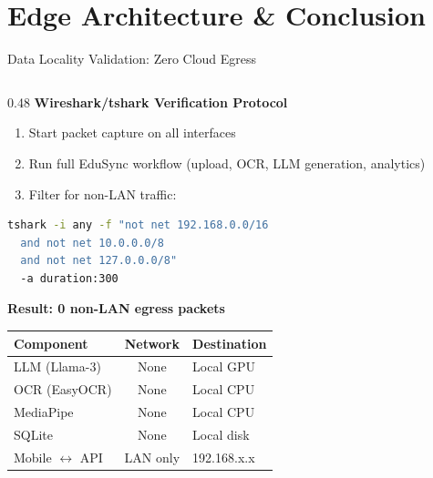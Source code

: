 \documentclass[aspectratio=169,10pt]{beamer}
\begin{document}
\section{Edge Architecture \& Conclusion}

\begin{frame}{Data Locality Validation: Zero Cloud Egress}
\begin{columns}[T]
\begin{column}{0.48\textwidth}
\textbf{Wireshark/tshark Verification Protocol}

\vspace{4pt}
\footnotesize
\begin{enumerate}\scriptsize
  \item Start packet capture on all interfaces
  \item Run full EduSync workflow (upload, OCR, LLM generation, analytics)
  \item Filter for non-LAN traffic:
\end{enumerate}

\vspace{2pt}
\begin{lstlisting}[language=bash, basicstyle=\ttfamily\tiny]
tshark -i any -f "not net 192.168.0.0/16
  and not net 10.0.0.0/8
  and not net 127.0.0.0/8"
  -a duration:300
\end{lstlisting}

\vspace{6pt}
\textbf{Result: 0 non-LAN egress packets}

\vspace{6pt}
\begin{tabular}{@{}lcl@{}}
\toprule
\textbf{Component} & \textbf{Network} & \textbf{Destination} \\
\midrule
LLM (Llama-3) & None & Local GPU \\
OCR (EasyOCR) & None & Local CPU \\
MediaPipe & None & Local CPU \\
SQLite & None & Local disk \\
Mobile $\leftrightarrow$ API & LAN only & 192.168.x.x \\
\bottomrule
\end{tabular}
\end{column}


\end{columns}
\end{frame}
\end{document}
